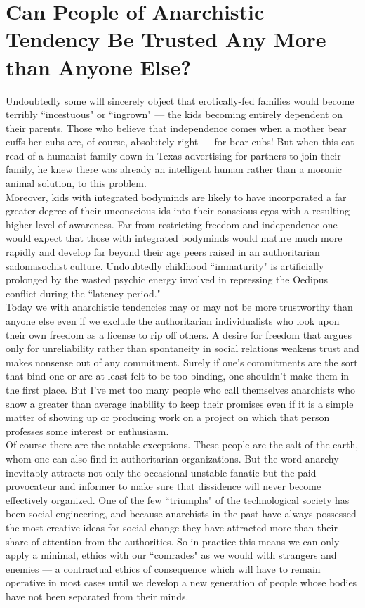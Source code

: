 \section*{Can People of Anarchistic Tendency Be Trusted Any More than Anyone Else?}
Undoubtedly some will sincerely object that erotically-fed families would become terribly ``incestuous" or ``ingrown" --- the kids becoming entirely dependent on their parents. Those who believe that independence comes when a mother bear cuffs her cubs are, of course, absolutely right --- for bear cubs! But when this cat read of a humanist family down in Texas advertising for partners to join their family, he knew there was already an intelligent human rather than a moronic animal solution, to this problem.\\
Moreover, kids with integrated bodyminds are likely to have incorporated a far greater degree of their unconscious ids into their conscious egos with a resulting higher level of awareness. Far from restricting freedom and independence one would expect that those with integrated bodyminds would mature much more rapidly and develop far beyond their age peers raised in an authoritarian sadomasochist culture. Undoubtedly childhood ``immaturity" is artificially prolonged by the wasted psychic energy involved in repressing the Oedipus conflict during the ``latency period."\\
Today we with anarchistic tendencies may or may not be more trustworthy than anyone else even if we exclude the authoritarian individualists who look upon their own freedom as a license to rip off others. A desire for freedom that argues only for unreliability rather than spontaneity in social relations weakens trust and makes nonsense out of any commitment. Surely if one's commitments are the sort that bind one or are at least felt to be too binding, one shouldn't make them in the first place. But I've met too many people who call themselves anarchists who show a greater than average inability to keep their promises even if it is a simple matter of showing up or producing work on a project on which that person professes some interest or enthusiasm.\\
Of course there are the notable exceptions. These people are the salt of the earth, whom one can also find in authoritarian organizations. But the word anarchy inevitably 
attracts not only the occasional unstable fanatic but the paid provocateur and informer to make sure that dissidence will never become effectively organized. One of the few ``triumphs" of the technological society has been social engineering, and because anarchists in the past have always possessed the most creative ideas for social change they have attracted more than their share of attention from the authorities. So in practice this means we can only apply a minimal, ethics with our ``comrades" as we would with strangers and enemies --- a contractual ethics of consequence which will have to remain operative in most cases until we develop a new generation of people whose bodies have not been separated from their minds.

